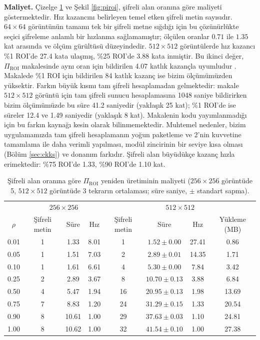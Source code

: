 \textbf{Maliyet.} Çizelge \ref{tbl:maliyet} ve Şekil \ref{fig:piroi}, şifreli alan oranına göre maliyeti göstermektedir. Hız kazancını belirleyen temel etken şifreli metin sayısıdır. $64 \times 64$ görüntünün tamamı tek bir şifreli metne sığdığı için bu çözünürlükte seçici şifreleme anlamlı bir hızlanma sağlamamıştır; ölçülen oranlar $0.71$ ile $1.35$ kat arasında ve ölçüm gürültüsü düzeyindedir. $512 \times 512$ görüntülerde hız kazancı \%1 ROI'de 27.4 kata ulaşmış, \%25 ROI'de 3.88 kata inmiştir. Bu ikinci değer, $\Pi_{\mathrm{ROI}}$ makalesinde aynı oran için bildirilen 4.07 katlık kazançla uyumludur \cite{bakas2026roi}. Makalede \%1 ROI için bildirilen 84 katlık kazanç ise bizim ölçümümüzden yüksektir. Farkın büyük kısmı tam şifreli hesaplamadan gelmektedir: makale $512 \times 512$ görüntü için tam şifreli sunucu hesaplamasına 1048 saniye bildirirken bizim ölçümümüzde bu süre 41.2 saniyedir (yaklaşık 25 kat); \%1 ROI'de ise süreler 12.4 ve 1.49 saniyedir (yaklaşık 8 kat). Makalenin kodu yayımlanmadığı için bu farkın kaynağı kesin olarak bilinmemektedir. Muhtemel nedenler, bizim uygulamamızda tam şifreli hesaplamanın yoğun paketleme ve 2'nin kuvvetine tamamlama ile daha verimli yapılması, modül zincirinin bir seviye kısa olması (Bölüm \ref{sec:ckks}) ve donanım farkıdır. Şifreli alan büyüdükçe kazanç hızla erimektedir: \%75 ROI'de 1.33, \%90 ROI'de 1.10 kat.

\begin{table}[h!]
{\setlength{\tabcolsep}{4pt}
\caption{Şifreli alan oranına göre $\Pi_{\mathrm{ROI}}$ yeniden üretiminin maliyeti ($256 \times 256$ görüntüde 5, $512 \times 512$ görüntüde 3 tekrarın ortalaması; süre saniye, $\pm$ standart sapma).}
\begin{center}
\vspace{-6mm}
{\small
\begin{tabular}{cccccccc}
\hline\hline
& \multicolumn{3}{c}{$256 \times 256$} & \multicolumn{4}{c}{$512 \times 512$} \\
$\rho$ & Şifreli metin & Süre & Hız & Şifreli metin & Süre & Hız & Yükleme (MB) \\
\hline
0.01 & 1 & 1.33 & 8.01 & 1 & $1.52 \pm 0.00$ & 27.41 & 0.86 \\
0.05 & 1 & 1.51 & 7.03 & 2 & $2.89 \pm 0.01$ & 14.35 & 1.71 \\
0.10 & 1 & 1.61 & 6.61 & 4 & $5.30 \pm 0.00$ & 7.84 & 3.42 \\
0.25 & 2 & 2.89 & 3.67 & 8 & $10.70 \pm 0.13$ & 3.88 & 6.84 \\
0.50 & 4 & 5.47 & 1.94 & 16 & $20.95 \pm 0.13$ & 1.98 & 13.69 \\
0.75 & 7 & 8.83 & 1.20 & 24 & $31.29 \pm 0.15$ & 1.33 & 20.54 \\
0.90 & 8 & 10.61 & 1.00 & 29 & $37.63 \pm 0.03$ & 1.10 & 24.81 \\
1.00 & 8 & 10.62 & 1.00 & 32 & $41.54 \pm 0.10$ & 1.00 & 27.38 \\
\hline
\end{tabular}}
\vspace{-6mm}
\end{center}
\label{tbl:maliyet}}
\end{table}

